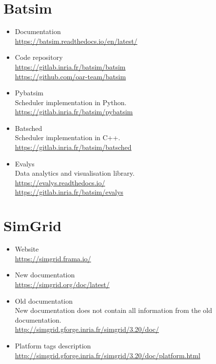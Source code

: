 \documentclass[thesis-en.tex]{subfiles}
\begin{document}
\section{Batsim}
\begin{itemize}
    \item Documentation\\
    \url{https://batsim.readthedocs.io/en/latest/}
    \item Code repository\\
    \url{https://gitlab.inria.fr/batsim/batsim}\\
    \url{https://github.com/oar-team/batsim}
    \item Pybatsim\\
    Scheduler implementation in Python.\\
    \url{https://gitlab.inria.fr/batsim/pybatsim}
    \item Batsched\\
    Scheduler implementation in C++.\\
    \url{https://gitlab.inria.fr/batsim/batsched}
    \item Evalys\\
    Data analytics and visualisation library.\\
    \url{https://evalys.readthedocs.io/}\\
    \url{https://gitlab.inria.fr/batsim/evalys}
\end{itemize}

\section{SimGrid}
\begin{itemize}
    \item Website\\
    \url{https://simgrid.frama.io/}
    \item New documentation\\
    \url{https://simgrid.org/doc/latest/}
    \item Old documentation\\
    New documentation does not contain all information from the old documentation.\\
    \url{http://simgrid.gforge.inria.fr/simgrid/3.20/doc/}
    \item Platform tags description\\
    \url{http://simgrid.gforge.inria.fr/simgrid/3.20/doc/platform.html}
\end{itemize}
\end{document}
